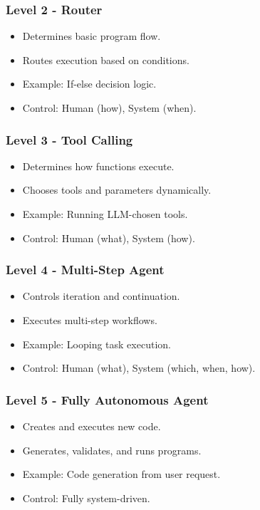 \begin{frame}[fragile]\frametitle{Level 2 - Router}
      \begin{itemize}
      \item Determines basic program flow.
      \item Routes execution based on conditions.
      \item Example: If-else decision logic.
      \item Control: Human (how), System (when).
      \end{itemize}
\end{frame}

\begin{frame}[fragile]\frametitle{Level 3 - Tool Calling}
      \begin{itemize}
      \item Determines how functions execute.
      \item Chooses tools and parameters dynamically.
      \item Example: Running LLM-chosen tools.
      \item Control: Human (what), System (how).
      \end{itemize}
\end{frame}

\begin{frame}[fragile]\frametitle{Level 4 - Multi-Step Agent}
      \begin{itemize}
      \item Controls iteration and continuation.
      \item Executes multi-step workflows.
      \item Example: Looping task execution.
      \item Control: Human (what), System (which, when, how).
      \end{itemize}
\end{frame}

\begin{frame}[fragile]\frametitle{Level 5 - Fully Autonomous Agent}
      \begin{itemize}
      \item Creates and executes new code.
      \item Generates, validates, and runs programs.
      \item Example: Code generation from user request.
      \item Control: Fully system-driven.
      \end{itemize}
\end{frame}

